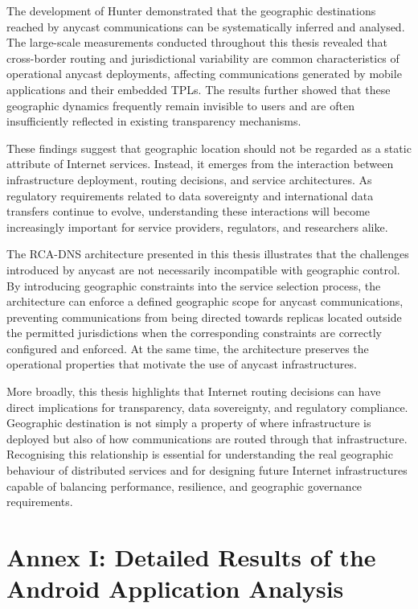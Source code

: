 \documentclass[
A4paper,                %
twoside,                %
openright,              %
chapterprefix=true,     %
12pt,                   %
headings=normal,        %
titlepage=on            %
]{book}
\begin{document}
The development of Hunter demonstrated that the geographic destinations reached by anycast communications can be systematically inferred and analysed. The large-scale measurements conducted throughout this thesis revealed that cross-border routing and jurisdictional variability are common characteristics of operational anycast deployments, affecting communications generated by mobile applications and their embedded TPLs. The results further showed that these geographic dynamics frequently remain invisible to users and are often insufficiently reflected in existing transparency mechanisms.

These findings suggest that geographic location should not be regarded as a static attribute of Internet services. Instead, it emerges from the interaction between infrastructure deployment, routing decisions, and service architectures. As regulatory requirements related to data sovereignty and international data transfers continue to evolve, understanding these interactions will become increasingly important for service providers, regulators, and researchers alike.

The RCA-DNS architecture presented in this thesis illustrates that the challenges introduced by anycast are not necessarily incompatible with geographic control. By introducing geographic constraints into the service selection process, the architecture can enforce a defined geographic scope for anycast communications, preventing communications from being directed towards replicas located outside the permitted jurisdictions when the corresponding constraints are correctly configured and enforced. At the same time, the architecture preserves the operational properties that motivate the use of anycast infrastructures.

More broadly, this thesis highlights that Internet routing decisions can have direct implications for transparency, data sovereignty, and regulatory compliance. Geographic destination is not simply a property of where infrastructure is deployed but also of how communications are routed through that infrastructure. Recognising this relationship is essential for understanding the real geographic behaviour of distributed services and for designing future Internet infrastructures capable of balancing performance, resilience, and geographic governance requirements.
 \newpage 

 \newpage \chapter{Annex I: Detailed Results of the Android Application Analysis}
\label{ch:appendix_android_analysis}
\end{document}
